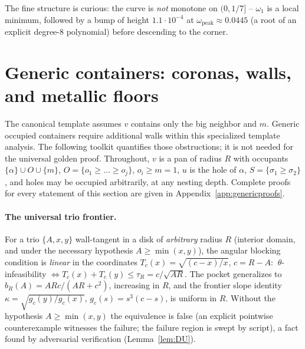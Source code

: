 \documentclass[11pt]{article}
\theoremstyle{definition}
\begin{document}
The fine structure is curious: the curve is \emph{not} monotone on
$(0,1/7]$ -- $\omega_1$ is a local minimum, followed by a bump of height
$1.1\cdot10^{-4}$ at $\omega_{\mathrm{peak}}\approx0.0445$ (a root of an
explicit degree-8 polynomial) before descending to the corner.

\section{Generic containers: coronas, walls, and metallic floors}
\label{sec:generic}

The canonical template assumes $v$ contains only the big neighbor and $m$.
Generic occupied containers require additional walls within this
specialized template analysis. The following toolkit quantifies those
obstructions; it is not needed for the universal golden proof. Throughout, $v$ is a pan of radius $R$ with occupants
$\{\alpha\}\cup O\cup\{m\}$, $O=\{o_1\ge\dots\ge o_j\}$, $o_i\ge m=1$,
$u$ is the hole of $\alpha$, $S=\{\sigma_1\ge\sigma_2\}$, and holes may be
occupied arbitrarily, at any nesting depth. Complete proofs for every
statement of this section are given in Appendix~\ref{app:genericproofs}.

\paragraph{The universal trio frontier.}
For a trio $\{A,x,y\}$ wall-tangent in a disk of \emph{arbitrary} radius $R$
(interior domain, and under the necessary hypothesis $A\ge\min(x,y)$), the
angular blocking condition is \emph{linear} in the coordinates
$T_c(x)=\sqrt{(c-x)/x}$, $c=R-A$:
$\ \theta$-infeasibility $\iff T_c(x)+T_c(y)\le\tau_R=c/\sqrt{AR}$.
The pocket generalizes to $b_R(A)=ARc/(AR+c^2)$, increasing in $R$, and the
frontier slope identity $\kappa=\sqrt{g_c(y)/g_c(x)}$, $g_c(s)=s^3(c-s)$, is
uniform in $R$. Without the hypothesis $A\ge\min(x,y)$ the equivalence is
false (an explicit pointwise counterexample witnesses the failure; the
failure region is swept by script), a fact
found by adversarial verification (Lemma~\ref{lem:DU}).
\end{document}
